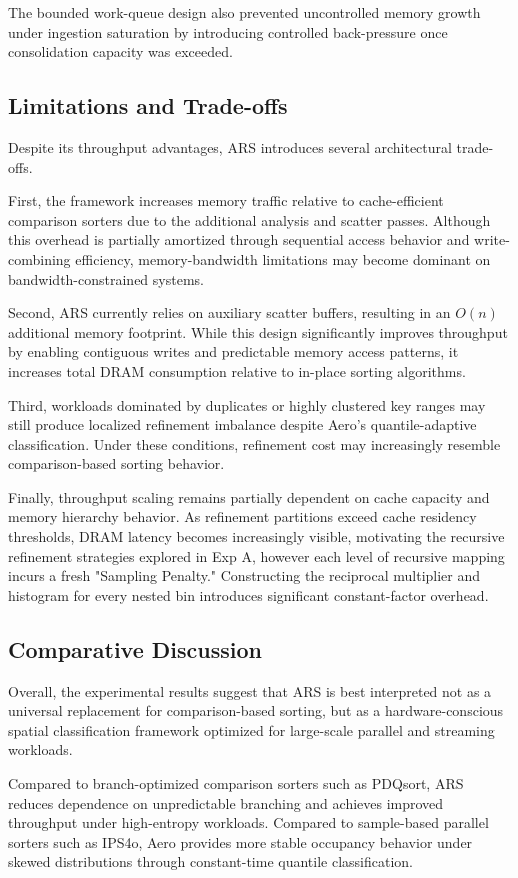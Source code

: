 The bounded work-queue design also prevented uncontrolled memory growth under ingestion saturation by introducing controlled back-pressure once consolidation capacity was exceeded.

\subsection{Limitations and Trade-offs}
Despite its throughput advantages, ARS introduces several architectural trade-offs.

First, the framework increases memory traffic relative to cache-efficient comparison sorters due to the additional analysis and scatter passes.
Although this overhead is partially amortized through sequential access behavior and write-combining efficiency, memory-bandwidth limitations may become dominant on bandwidth-constrained systems.

Second, ARS currently relies on auxiliary scatter buffers, resulting in an $O(n)$ additional memory footprint.
While this design significantly improves throughput by enabling contiguous writes and predictable memory access patterns, it increases total DRAM consumption relative to in-place sorting algorithms.

Third, workloads dominated by duplicates or highly clustered key ranges may still produce localized refinement imbalance despite Aero's quantile-adaptive classification.
Under these conditions, refinement cost may increasingly resemble comparison-based sorting behavior.

Finally, throughput scaling remains partially dependent on cache capacity and memory hierarchy behavior.
As refinement partitions exceed cache residency thresholds, DRAM latency becomes increasingly visible, motivating the recursive refinement strategies explored in Exp A, however each level of recursive mapping incurs a fresh "Sampling Penalty."
Constructing the reciprocal multiplier and histogram for every nested bin introduces significant constant-factor overhead.

\subsection{Comparative Discussion}
Overall, the experimental results suggest that ARS is best interpreted not as a universal replacement for comparison-based sorting, but as a hardware-conscious spatial classification framework optimized for large-scale parallel and streaming workloads.

Compared to branch-optimized comparison sorters such as PDQsort, ARS reduces dependence on unpredictable branching and achieves improved throughput under high-entropy workloads.
Compared to sample-based parallel sorters such as IPS4o, Aero provides more stable occupancy behavior under skewed distributions through constant-time quantile classification.

